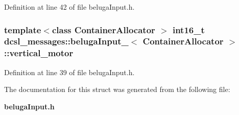 \-Definition at line 42 of file beluga\-Input.\-h.

\subsubsection[{vertical\-\_\-motor}]{\setlength{\rightskip}{0pt plus 5cm}template$<$class Container\-Allocator $>$ int16\-\_\-t {\bf dcsl\-\_\-messages\-::beluga\-Input\-\_\-}$<$ \-Container\-Allocator $>$\-::{\bf vertical\-\_\-motor}}\label{structdcsl__messages_1_1belugaInput___a65b2537044da4da886d41605f5b01488}


\-Definition at line 39 of file beluga\-Input.\-h.



\-The documentation for this struct was generated from the following file\-:\begin{DoxyCompactItemize}
\item 
{\bf beluga\-Input.\-h}\end{DoxyCompactItemize}
